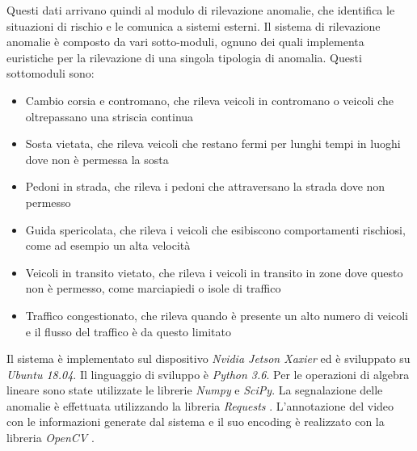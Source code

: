 Questi dati arrivano quindi al modulo di rilevazione anomalie, che identifica le situazioni di rischio e le comunica a sistemi esterni.
Il sistema di rilevazione anomalie è composto da vari sotto-moduli, ognuno dei quali implementa euristiche per la rilevazione di una singola tipologia di anomalia. Questi sottomoduli sono:
\begin{itemize}
    \item Cambio corsia e contromano, che rileva veicoli in contromano o veicoli che oltrepassano una striscia continua
    \item Sosta vietata, che rileva veicoli che restano fermi per lunghi tempi in luoghi dove non è permessa la sosta
    \item Pedoni in strada, che rileva i pedoni che attraversano la strada dove non permesso
    \item Guida spericolata, che rileva i veicoli che esibiscono comportamenti rischiosi, come ad esempio un alta velocità
    \item Veicoli in transito vietato, che rileva i veicoli in transito in zone dove questo non è permesso, come marciapiedi o isole di traffico
    \item Traffico congestionato, che rileva quando è presente un alto numero di veicoli e il flusso del traffico è da questo limitato
\end{itemize}

Il sistema è implementato sul dispositivo \emph{Nvidia Jetson Xaxier}\cite{arch:jetson} ed è sviluppato su \emph{Ubuntu 18.04}\cite{arch:ubuntu}.
Il linguaggio di sviluppo è \emph{Python 3.6}\cite{arch:python}.
Per le operazioni di algebra lineare sono state utilizzate le librerie \emph{Numpy}\cite{arch:numpy} e \emph{SciPy}\cite{arch:scipy}.
La segnalazione delle anomalie è effettuata utilizzando la libreria \emph{Requests} \cite{arch:requests}.
L'annotazione del video con le informazioni generate dal sistema e il suo encoding è realizzato con la libreria \emph{OpenCV} \cite{opencv}.

